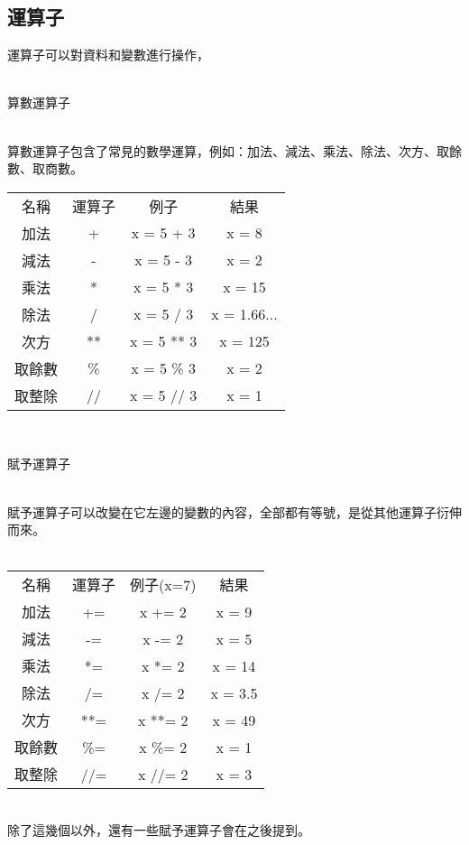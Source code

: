 \documentclass{article}
\begin{document}
\begin{large}
    
    
    \section{運算子}
        運算子可以對資料和變數進行操作，\\
        \\
        \begin{LARGE}
        算數運算子\\
        \end{LARGE}
        \\
        算數運算子包含了常見的數學運算，例如：加法、減法、乘法、除法、次方、取餘數、取商數。\\
        \begin{tabular}{ |c|c|c|c| } 
            \hline
            名稱 & 運算子 & 例子 & 結果 \\
            加法 & + & x = 5 + 3 & x = 8 \\
            減法 & - & x = 5 - 3 & x = 2 \\
            乘法 & * & x = 5 * 3 & x = 15 \\
            除法 & / & x = 5 / 3 & x = 1.66... \\
            次方 & ** & x = 5 ** 3 & x = 125 \\
            取餘數& \% & x = 5 \% 3 & x = 2 \\
            取整除& // & x = 5 // 3 & x = 1 \\
            \hline
        \end{tabular}
        \\
        \begin{LARGE}
        賦予運算子\\
        \end{LARGE}
        \\
        賦予運算子可以改變在它左邊的變數的內容，全部都有等號，是從其他運算子衍伸而來。\\
        \\
        \begin{tabular}{ |c|c|c|c| } 
            \hline
            名稱 & 運算子 & 例子(x=7) & 結果 \\
            加法 & += & x += 2 & x = 9 \\
            減法 & -= & x -= 2 & x = 5 \\
            乘法 & *= & x *= 2 & x = 14 \\
            除法 & /= & x /= 2 & x = 3.5 \\
            次方 & **= & x **= 2 & x = 49 \\
            取餘數& \%= & x \%= 2 & x = 1 \\
            取整除& //= & x //= 2 & x = 3 \\
            \hline
        \end{tabular}
        \\
        除了這幾個以外，還有一些賦予運算子會在之後提到。
    

\end{large}
\end{document}
